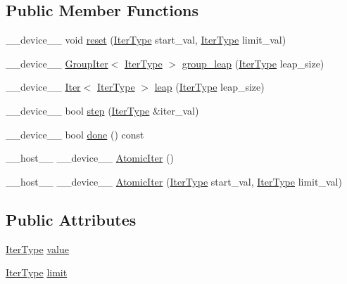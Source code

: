 \subsection*{Public Member Functions}
\begin{DoxyCompactItemize}
\item 
\-\_\-\-\_\-device\-\_\-\-\_\- void \hyperlink{structutil_1_1AtomicIter_ae164e1cc98ab2757a20a15b5de55be1c}{reset} (\hyperlink{structutil_1_1AtomicIter_acc67d8bb75f4998782b2f8643ff5abc4}{Iter\-Type} start\-\_\-val, \hyperlink{structutil_1_1AtomicIter_acc67d8bb75f4998782b2f8643ff5abc4}{Iter\-Type} limit\-\_\-val)
\item 
\-\_\-\-\_\-device\-\_\-\-\_\- \hyperlink{structutil_1_1GroupIter}{Group\-Iter}$<$ \hyperlink{structutil_1_1AtomicIter_acc67d8bb75f4998782b2f8643ff5abc4}{Iter\-Type} $>$ \hyperlink{structutil_1_1AtomicIter_a3a83058a5cc2e21a3ab4e0bf405a8c40}{group\-\_\-leap} (\hyperlink{structutil_1_1AtomicIter_acc67d8bb75f4998782b2f8643ff5abc4}{Iter\-Type} leap\-\_\-size)
\item 
\-\_\-\-\_\-device\-\_\-\-\_\- \hyperlink{structutil_1_1Iter}{Iter}$<$ \hyperlink{structutil_1_1AtomicIter_acc67d8bb75f4998782b2f8643ff5abc4}{Iter\-Type} $>$ \hyperlink{structutil_1_1AtomicIter_abf686270fbc4270b2ab075ad996c8444}{leap} (\hyperlink{structutil_1_1AtomicIter_acc67d8bb75f4998782b2f8643ff5abc4}{Iter\-Type} leap\-\_\-size)
\item 
\-\_\-\-\_\-device\-\_\-\-\_\- bool \hyperlink{structutil_1_1AtomicIter_a28f37a53706b452867b492858031acf7}{step} (\hyperlink{structutil_1_1AtomicIter_acc67d8bb75f4998782b2f8643ff5abc4}{Iter\-Type} \&iter\-\_\-val)
\item 
\-\_\-\-\_\-device\-\_\-\-\_\- bool \hyperlink{structutil_1_1AtomicIter_a4bb7226bbe3bd53ba97a03d301cd3822}{done} () const 
\item 
\-\_\-\-\_\-host\-\_\-\-\_\- \-\_\-\-\_\-device\-\_\-\-\_\- \hyperlink{structutil_1_1AtomicIter_ace0bc96d7b0193019f054f5ab44b6081}{Atomic\-Iter} ()
\item 
\-\_\-\-\_\-host\-\_\-\-\_\- \-\_\-\-\_\-device\-\_\-\-\_\- \hyperlink{structutil_1_1AtomicIter_ae03206bbcce799972e6fc2b3583d7047}{Atomic\-Iter} (\hyperlink{structutil_1_1AtomicIter_acc67d8bb75f4998782b2f8643ff5abc4}{Iter\-Type} start\-\_\-val, \hyperlink{structutil_1_1AtomicIter_acc67d8bb75f4998782b2f8643ff5abc4}{Iter\-Type} limit\-\_\-val)
\end{DoxyCompactItemize}
\subsection*{Public Attributes}
\begin{DoxyCompactItemize}
\item 
\hyperlink{structutil_1_1AtomicIter_acc67d8bb75f4998782b2f8643ff5abc4}{Iter\-Type} \hyperlink{structutil_1_1AtomicIter_a774c1053e1735c852e7bdcf008ca403b}{value}
\item 
\hyperlink{structutil_1_1AtomicIter_acc67d8bb75f4998782b2f8643ff5abc4}{Iter\-Type} \hyperlink{structutil_1_1AtomicIter_aa793192cf4d1a784e36512ab58d366e7}{limit}
\end{DoxyCompactItemize}


